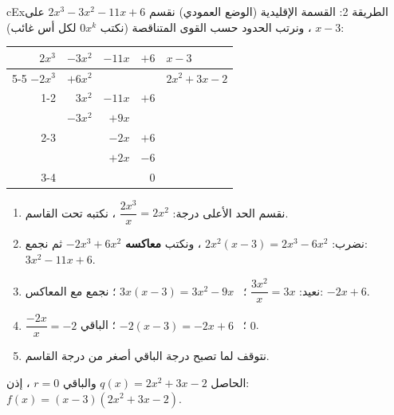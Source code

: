 \documentclass[12pt,a4paper]{article}
\newenvironment{LTR}{\begin{otherlanguage}{english}}{\end{otherlanguage}}
\begin{document}
\begin{otherlanguage}{english}\begin{arbox}[breakable]{cEx}{الطريقة 2: القسمة الإقليدية (الوضع العمودي)}
نقسم $2x^3-3x^2-11x+6$ على $x-3$ ، ونرتب الحدود حسب القوى المتناقصة (نكتب $0x^k$ لكل أس غائب):
\begin{center}
\begin{LTR}
\renewcommand{\arraystretch}{1.3}
\begin{tabular}{rrrr|l}
$2x^3$ & $-3x^2$ & $-11x$ & $+6$ & $x-3$\\\cline{5-5}
$-2x^3$ & $+6x^2$ &  &  & \textcolor{cDef}{$2x^2+3x-2$}\\\cline{1-2}
 & $3x^2$ & $-11x$ & $+6$ & \\
 & $-3x^2$ & $+9x$ &  & \\\cline{2-3}
 &  & $-2x$ & $+6$ & \\
 &  & $+2x$ & $-6$ & \\\cline{3-4}
 &  &  & \textcolor{cThm}{$0$} & 
\end{tabular}
\end{LTR}
\end{center}
\begin{enumerate}
\item نقسم الحد الأعلى درجة: $\dfrac{2x^3}{x}=2x^2$ ، نكتبه تحت القاسم.
\item نضرب: $2x^2(x-3)=2x^3-6x^2$ ، ونكتب \textbf{معاكسه} $-2x^3+6x^2$ ثم نجمع: $3x^2-11x+6$.
\item نعيد: $\dfrac{3x^2}{x}=3x$ ؛ \ $3x(x-3)=3x^2-9x$ ؛ نجمع مع المعاكس: $-2x+6$.
\item $\dfrac{-2x}{x}=-2$ ؛ \ $-2(x-3)=-2x+6$ ؛ الباقي $0$.
\item نتوقف لما تصبح درجة الباقي أصغر من درجة القاسم.
\end{enumerate}
الحاصل $q(x)=2x^2+3x-2$ والباقي $r=0$ ، إذن: \ $\boxed{f(x)=(x-3)\left(2x^2+3x-2\right)}$.
\end{arbox}\end{otherlanguage}
\end{document}
